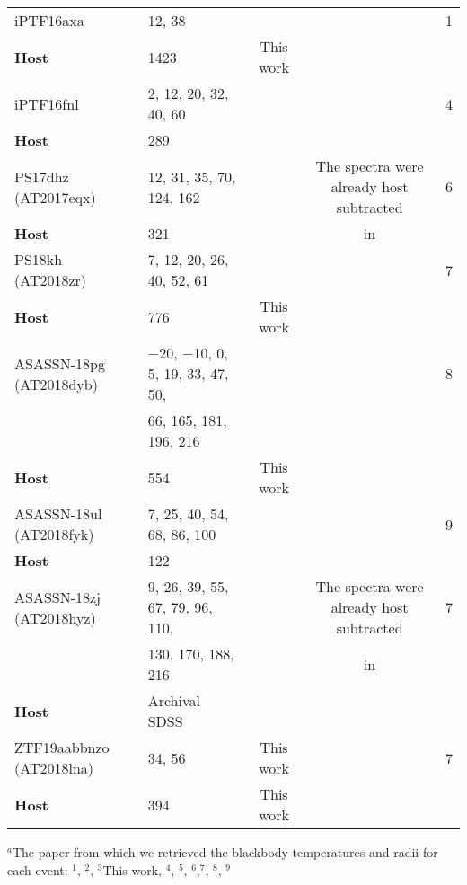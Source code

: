 \documentclass[structabstract]{aa}
\begin{document}
\begin{small}
\begin{longtable}{l l c c | c}
\hline
iPTF16axa  & 12, 38 &\citet{Hung2017} & &1 \\
\textbf{Host}   & 1423 &This work & & \\
\hline
iPTF16fnl  & 2, 12, 20, 32, 40, 60 &\citet{Onori2019} & &4 \\
\textbf{Host}   & 289 & \citet{Onori2019}& & \\
\hline
PS17dhz (AT2017eqx) & 12, 31, 35, 70, 124, 162 &\citet{Nicholl2019} & The spectra were already host subtracted &6\\
\textbf{Host}   & 321 &\citet{Nicholl2019} & in \citet{Nicholl2019} &\\
\hline
PS18kh (AT2018zr) & 7, 12, 20, 26, 40, 52, 61 & \citet{Holoien2018}& &7 \\
\textbf{Host}   & 776 &This work & & \\
\hline
ASASSN-18pg (AT2018dyb) & $-$20, $-$10, 0, 5, 19, 33, 47, 50, & \citet{Leloudas2019}& &8 \\
& 66, 165, 181, 196, 216 & & \\
\textbf{Host}   & 554 &This work & & \\
\hline
ASASSN-18ul (AT2018fyk) & 7, 25, 40, 54, 68, 86, 100 & \citet{Wevers2019}& &9 \\
\textbf{Host}   & 122 &\citet{Wevers2019} & & \\
\hline
ASASSN-18zj (AT2018hyz) & 9, 26, 39, 55, 67, 79, 96, 110,  & \citet{Short2020a}& The spectra were already host subtracted &7 \\
& 130, 170, 188, 216 & & in \citet{Short2020a} \\
\textbf{Host}   & Archival SDSS &\citet{Short2020a} & & \\
\hline
ZTF19aabbnzo (AT2018lna) & 34, 56 & This work& &7 \\
\textbf{Host}   & 394 & This work&  &\\
\hline
\end{longtable}
$^{a}$The paper from which we retrieved the blackbody temperatures and radii for each event: $^1$\citet{Hung2017}, $^2$\citet{Arcavi2014}, $^3$This work, $^4$\citet{Holoien2018}, 
 $^5$\citet{Blagorodnova2018},
$^{6}$\citet{Nicholl2019},$^{7}$\citet{vanvelzen2021}, $^{8}$\citet{Leloudas2019}, $^{9}$\citet{Wevers2019}
\end{small}

\vspace{3.5cm}
\end{document}

